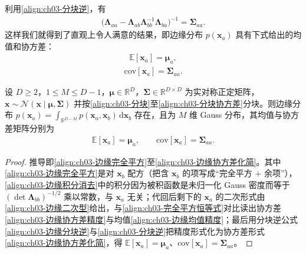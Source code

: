 \documentclass[../../main.tex]{subfiles}
\begin{document}
利用\eqref{align:ch03-分块逆}，有
\begin{align}
\bigl(\boldsymbol{\Lambda}_{aa}-\boldsymbol{\Lambda}_{ab}\boldsymbol{\Lambda}_{bb}^{-1}\boldsymbol{\Lambda}_{ba}\bigr)^{-1}=\boldsymbol{\Sigma}_{aa}.
\label{align:ch03-边缘协方差化简}
\end{align}
这样我们就得到了直观上令人满意的结果，即边缘分布 $p(\boldsymbol{x}_{a})$ 具有下式给出的均值和协方差：
\begin{align}
\mathbb{E}[\boldsymbol{x}_{a}]=\boldsymbol{\mu}_{a},
\label{align:ch03-边缘均值}
\end{align}
\begin{align}
\mathrm{cov}[\boldsymbol{x}_{a}]=\boldsymbol{\Sigma}_{aa}.
\label{align:ch03-边缘协方差}
\end{align}

\begin{proposition}[边缘 Gauss 分布]\label{proposition:ch03-边缘Gauss}
设 $D\geqslant2$，$1\leqslant M\leqslant D-1$，$\boldsymbol{\mu}\in\mathbb{R}^{D}$，$\boldsymbol{\Sigma}\in\mathbb{R}^{D\times D}$ 为实对称正定矩阵，$\boldsymbol{x}\sim\mathcal{N}(\boldsymbol{x}\mid\boldsymbol{\mu},\boldsymbol{\Sigma})$ 并按\eqref{align:ch03-分块}至\eqref{align:ch03-分块协方差}分块。则边缘分布 $p(\boldsymbol{x}_{a})=\int_{\mathbb{R}^{D-M}}p(\boldsymbol{x}_{a},\boldsymbol{x}_{b})\,\mathrm{d}\boldsymbol{x}_{b}$ 存在，且为 $M$ 维 Gauss 分布，其均值与协方差矩阵分别为
\begin{align*}
\mathbb{E}[\boldsymbol{x}_{a}]=\boldsymbol{\mu}_{a},\qquad \mathrm{cov}[\boldsymbol{x}_{a}]=\boldsymbol{\Sigma}_{aa}.
\end{align*}
\end{proposition}
\begin{proof}
推导即\eqref{align:ch03-边缘完全平方}至\eqref{align:ch03-边缘协方差化简}。其中\eqref{align:ch03-边缘完全平方}是对 $\boldsymbol{x}_{b}$ 配方（把含 $\boldsymbol{x}_{b}$ 的项写成“完全平方 $+$ 余项”），\eqref{align:ch03-边缘积分消去}中的积分因为被积函数是未归一化 Gauss 密度而等于 $(\det\boldsymbol{\Lambda}_{bb})^{-1/2}$ 乘以常数，与 $\boldsymbol{x}_{a}$ 无关；代回后剩下的 $\boldsymbol{x}_{a}$ 的二次形式由\eqref{align:ch03-边缘二次型}给出，与\eqref{align:ch03-完全平方恒等式}对比读出协方差\eqref{align:ch03-边缘协方差精度}与均值\eqref{align:ch03-边缘均值精度}；最后用分块逆公式\eqref{align:ch03-边缘分块逆}与\eqref{align:ch03-分块逆}把精度形式化为协方差形式\eqref{align:ch03-边缘协方差化简}，得 $\mathbb{E}[\boldsymbol{x}_{a}]=\boldsymbol{\mu}_{a}$、$\mathrm{cov}[\boldsymbol{x}_{a}]=\boldsymbol{\Sigma}_{aa}$。
\end{proof}
\end{document}
